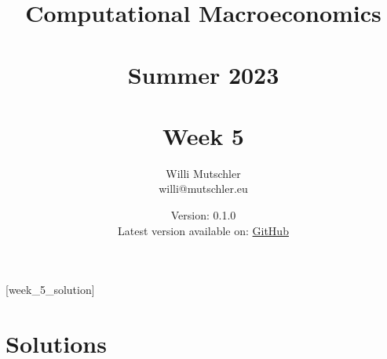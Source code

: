 
\newif\ifDisplaySolutions\DisplaySolutionstrue


\title{Computational Macroeconomics\\~\\Summer 2023\\~\\Week 5}
\author{Willi Mutschler\\willi@mutschler.eu}
\date{Version: 0.1.0\\Latest version available on: \href{https://github.com/wmutschl/Computational-Macroeconomics/releases/latest/download/week_5.pdf}{GitHub}}
\maketitle\thispagestyle{empty}

\newpage
{}[week_5_solution]
\tableofcontents\thispagestyle{empty}\newpage

\setcounter{page}{1}
\newpage


\printbibliography
\newpage

\ifDisplaySolutions
\newpage
\appendix
\section{Solutions}

\fi
